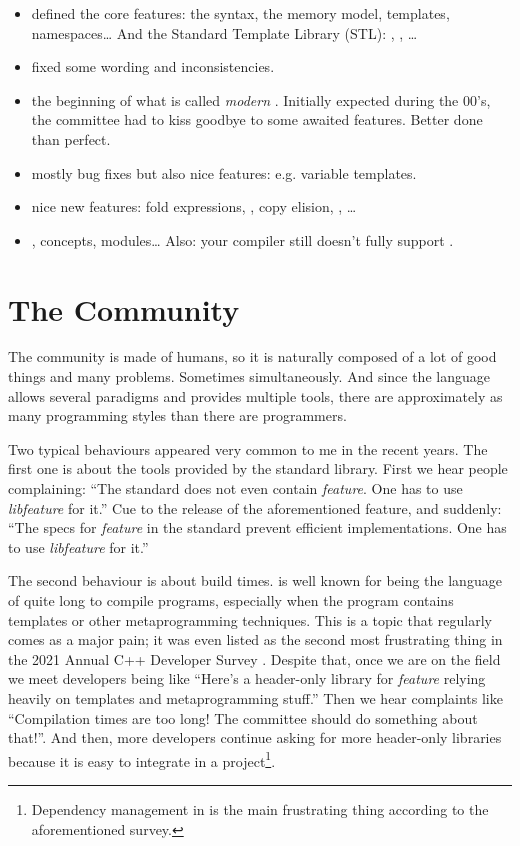 \begin{itemize}
\item {\bf {}} defined the core features: the syntax, the memory
  model, templates, namespaces… And the Standard Template Library
  (STL): , , …
\item {\bf {}} fixed some wording and inconsistencies.
\item {\bf {}} the beginning of what is called \emph{modern
  \cpp}. Initially expected during the 00's, the committee had to kiss
  goodbye to some awaited features. Better done than perfect.
\item {\bf {}} mostly bug fixes but also nice features:
  e.g. variable templates.
\item {\bf {}} nice new features: fold expressions, , copy elision, , …
\item {\bf {}} , concepts, modules… Also: your
  compiler still doesn't fully support .
\end{itemize}

\section{The Community}

The \cpp{} community is made of humans, so it is naturally composed of
a lot of good things and many problems. Sometimes simultaneously. And
since the language allows several paradigms and provides multiple
tools, there are approximately as many programming styles than there
are \cpp{} programmers.

Two typical behaviours appeared very common to me in the recent
years. The first one is about the tools provided by the standard
library. First we hear people complaining: ``The standard does not
even contain {\em feature}. One has to use {\em libfeature} for it.''
Cue to the release of the aforementioned feature, and suddenly: ``The
specs for {\em feature} in the standard prevent efficient
implementations. One has to use {\em libfeature} for it.''

The second behaviour is about build times. \Cpp{} is well known for
being the language of quite long to compile programs, especially when
the program contains templates or other metaprogramming
techniques. This is a topic that regularly comes as a major pain; it
was even listed as the second most frustrating thing in the 2021
Annual C++ Developer Survey
\cite{2021-annual-cpp-developer-survey}. Despite that, once we are on
the field we meet developers being like ``Here's a header-only library
for {\em feature} relying heavily on templates and metaprogramming
stuff.'' Then we hear complaints like ``Compilation times are too
long!  The committee should do something about that!''. And then, more
developers continue asking for more header-only libraries because it
is easy to integrate in a project\footnote{Dependency management in
  \cpp{} is the main frustrating thing according to the aforementioned
  survey.}.

